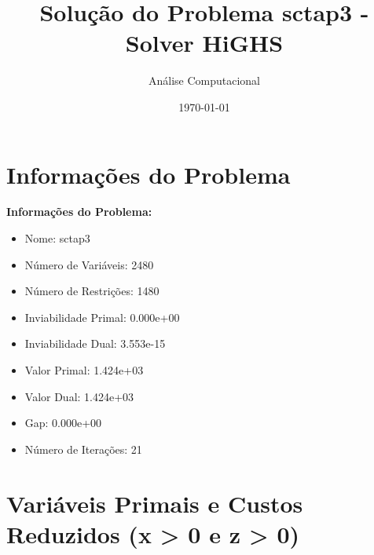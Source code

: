 \documentclass[12pt]{article}
\title{Solução do Problema sctap3 - Solver HiGHS}
\author{Análise Computacional}
\date{\today}
\begin{document}
\maketitle

\section{Informações do Problema}

\textbf{Informações do Problema:}
\begin{itemize}
\item Nome: sctap3
\item Número de Variáveis: 2480
\item Número de Restrições: 1480
\item Inviabilidade Primal: 0.000e+00
\item Inviabilidade Dual: 3.553e-15
\item Valor Primal: 1.424e+03
\item Valor Dual: 1.424e+03
\item Gap: 0.000e+00
\item Número de Iterações: 21
\end{itemize}


\section{Variáveis Primais e Custos Reduzidos (x > 0 e z > 0)}
\end{document}
